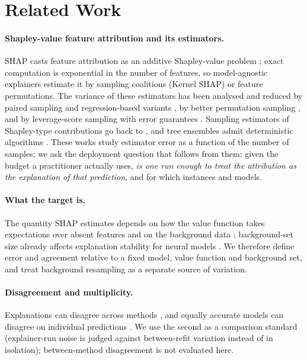 \section{Related Work}
\label{sec:related}

\paragraph{Shapley-value feature attribution and its estimators.}
SHAP casts feature attribution as an additive Shapley-value problem \citep{lundberg2017unified}; exact computation is exponential in the number of features, so model-agnostic explainers estimate it by sampling coalitions (Kernel SHAP) or feature permutations. The variance of these estimators has been analysed and reduced by paired sampling and regression-based variants \citep{covert2021improving}, by better permutation sampling \citep{mitchell2022sampling}, and by leverage-score sampling with error guarantees \citep{musco2025leverage}. Sampling estimators of Shapley-type contributions go back to \citet{strumbelj2014explaining}, and tree ensembles admit deterministic algorithms \citep{lundberg2020local}. These works study estimator error as a function of the number of samples; we ask the deployment question that follows from them: given the budget a practitioner actually uses, \emph{is one run enough to treat the attribution as the explanation of that prediction}, and for which instances and models.

\paragraph{What the target is.}
The quantity SHAP estimates depends on how the value function takes expectations over absent features and on the background data \citep{chen2020true}; background-set size already affects explanation stability for neural models \citep{yuan2023background}. We therefore define error and agreement relative to a fixed model, value function and background set, and treat background resampling as a separate source of variation.

\paragraph{Disagreement and multiplicity.}
Explanations can disagree across methods \citep{krishna2024disagreement}, and equally accurate models can disagree on individual predictions \citep{marx2020predictive}. We use the second as a comparison standard (explainer-run noise is judged against between-refit variation instead of in isolation); between-method disagreement is not evaluated here.

